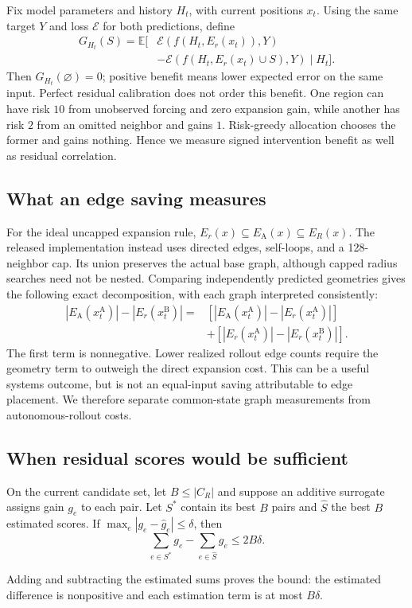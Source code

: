 Fix model parameters and history $H_t$, with current positions $x_t$. Using the same target $Y$ and loss $\mathcal E$ for both predictions, define
\begin{align}
 G_{H_t}(S)=\mathbb E[&\mathcal E(f(H_t,E_r(x_t)),Y)\nonumber\\
              &-\mathcal E(f(H_t,E_r(x_t)\cup S),Y)\mid H_t].
\end{align}
Then $G_{H_t}(\varnothing)=0$; positive benefit means lower expected error on the same input. Perfect residual calibration does not order this benefit. One region can have risk $10$ from unobserved forcing and zero expansion gain, while another has risk $2$ from an omitted neighbor and gains $1$. Risk-greedy allocation chooses the former and gains nothing. Hence we measure signed intervention benefit as well as residual correlation.

\subsection{What an edge saving measures}
For the ideal uncapped expansion rule, $E_r(x)\subseteq E_{\mathrm A}(x)\subseteq E_R(x)$. The released implementation instead uses directed edges, self-loops, and a 128-neighbor cap. Its union preserves the actual base graph, although capped radius searches need not be nested. Comparing independently predicted geometries gives the following exact decomposition, with each graph interpreted consistently:
\begin{align}
 |E_{\mathrm A}(x_t^{\mathrm A})|-|E_r(x_t^{\mathrm B})|
 ={}&[|E_{\mathrm A}(x_t^{\mathrm A})|-|E_r(x_t^{\mathrm A})|]\nonumber\\
 &+[|E_r(x_t^{\mathrm A})|-|E_r(x_t^{\mathrm B})|].
 \label{eq:decomposition}
\end{align}
The first term is nonnegative. Lower realized rollout edge counts require the geometry term to outweigh the direct expansion cost. This can be a useful systems outcome, but is not an equal-input saving attributable to edge placement. We therefore separate common-state graph measurements from autonomous-rollout costs.

\subsection{When residual scores would be sufficient}
\begin{proposition}
On the current candidate set, let $B\le |C_R|$ and suppose an additive surrogate assigns gain $g_e$ to each pair. Let $S^*$ contain its best $B$ pairs and $\widehat S$ the best $B$ estimated scores. If $\max_e|g_e-\widehat g_e|\le\delta$, then
\begin{equation}
 \sum_{e\in S^*}g_e-\sum_{e\in\widehat S}g_e\le2B\delta.
 \label{eq:regret}
\end{equation}
\end{proposition}
Adding and subtracting the estimated sums proves the bound: the estimated difference is nonpositive and each estimation term is at most $B\delta$.

